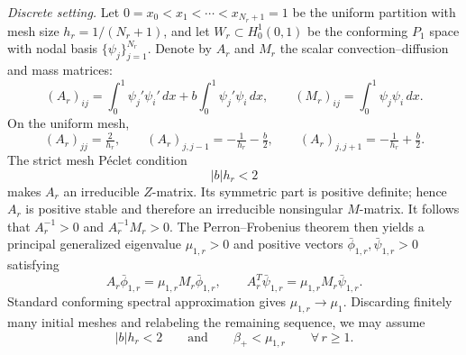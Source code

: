 \documentclass[preprint,10pt]{elsarticle}
\theoremstyle{plain}
\theoremstyle{definition}
\theoremstyle{remark}
\begin{document}
\smallskip
\noindent\textit{Discrete setting.}
Let $0=x_0<x_1<\cdots<x_{N_r+1}=1$ be the uniform partition with mesh size
$h_r=1/(N_r+1)$, and let $W_r\subset H_0^1(0,1)$ be the conforming $P_1$
space with nodal basis $\{\psi_j\}_{j=1}^{N_r}$. Denote by $A_r$ and $M_r$
the scalar convection--diffusion and mass matrices:
\[
(A_r)_{ij}=\int_0^1\psi_j'\psi_i'\,dx+b\int_0^1\psi_j'\psi_i\,dx,
\qquad
(M_r)_{ij}=\int_0^1\psi_j\psi_i\,dx.
\]
On the uniform mesh,
\begin{equation}\label{eq:complete-model-scalar-matrix}
	(A_r)_{jj}=\tfrac{2}{h_r}, \qquad
	(A_r)_{j,j-1}=-\tfrac{1}{h_r}-\tfrac{b}{2}, \qquad
	(A_r)_{j,j+1}=-\tfrac{1}{h_r}+\tfrac{b}{2}.
\end{equation}
The strict mesh P\'eclet condition
\begin{equation}\label{eq:complete-model-peclet}
	|b|h_r<2
\end{equation}
makes $A_r$ an irreducible $Z$-matrix. Its symmetric part is positive
definite; hence $A_r$ is positive stable and therefore an irreducible
nonsingular $M$-matrix. It follows that $A_r^{-1}>0$ and $A_r^{-1}M_r>0$.
The Perron--Frobenius theorem then yields a principal generalized eigenvalue
$\mu_{1,r}>0$ and positive vectors $\bar\phi_{1,r},\bar\psi_{1,r}>0$ satisfying
\begin{equation}\label{eq:complete-model-discrete-scalar-eigenpairs}
	A_r\bar\phi_{1,r}=\mu_{1,r}M_r\bar\phi_{1,r}, \qquad
	A_r^T\bar\psi_{1,r}=\mu_{1,r}M_r\bar\psi_{1,r}.
\end{equation}
Standard conforming spectral approximation gives $\mu_{1,r}\to\mu_1$.
Discarding finitely many initial meshes and relabeling the remaining sequence,
we may assume
\begin{equation}\label{eq:complete-model-fine-mesh}
	|b|h_r<2 \qquad\text{and}\qquad \beta_+<\mu_{1,r}
	\qquad \forall\,r\ge1.
\end{equation}
\end{document}
